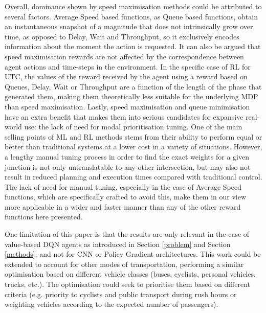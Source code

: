 \documentclass[conference]{IEEEtran}
\begin{document}
Overall, dominance shown by speed maximisation methods could be attributed to several factors.
Average Speed based functions, as Queue based functions, obtain an instantaneous snapshot of a magnitude that does not intrinsically grow over time, as opposed to Delay, Wait and Throughput, so it exclusively encodes information about the moment the action is requested.
It can also be argued that speed maximisation rewards are not affected by the correspondence between agent actions and time-steps in the environment. In the specific case of RL for UTC, the values of the reward received by the agent using a reward based on Queues, Delay, Wait or Throughput are a function of the length of the phase that generated them, making them theoretically less suitable for the underlying MDP than speed maximisation.
Lastly, speed maximisation and queue minimisation have an extra benefit that makes them into serious candidates for expansive real-world use: the lack of need for modal prioritisation tuning.
One of the main selling points of ML and RL methods stems from their ability to perform equal or better than traditional systems at a lower cost in a variety of situations.
However, a lengthy manual tuning process in order to find the exact weights for a given junction is not only untranslatable to any other intersection, but may also not result in reduced planning and execution times compared with traditional control.
The lack of need for manual tuning, especially in the case of Average Speed functions, which are specifically crafted to avoid this, make them in our view more applicable in a wider and faster manner than any of the other reward functions here presented.

One limitation of this paper is that the results are only relevant in the case of value-based DQN agents as introduced in Section \ref{problem} and Section \ref{methods}, and not for CNN or Policy Gradient architectures.
This work could be extended to account for other modes of transportation, performing a similar optimisation based on different vehicle classes (buses, cyclists, personal vehicles, trucks, etc.). The optimisation could seek to prioritise them based on different criteria (e.g. priority to cyclists and public transport during rush hours or weighting vehicles according to the expected number of passengers).

%
\end{document}
